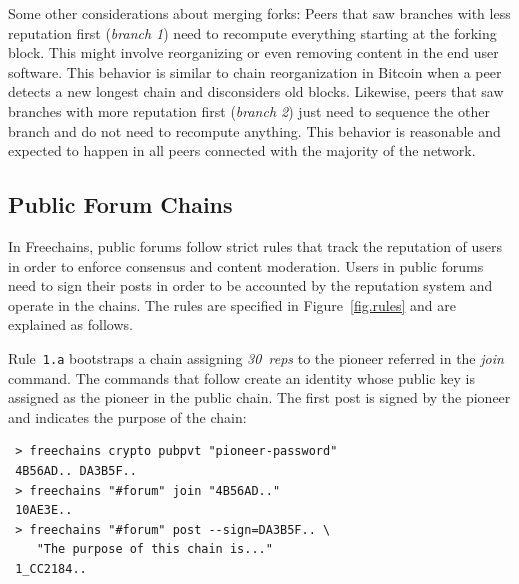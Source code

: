 \documentclass[10pt,journal,compsoc]{IEEEtran}
\newcommand{\FC}       {Freechains\xspace}
\newcommand{\reps}     {\emph{reps}\xspace}
\newcommand{\nreps}[1] {\emph{#1~reps\xspace}}
\begin{document}
Some other considerations about merging forks:
Peers that saw branches with less reputation first (\emph{branch 1}) need to
recompute everything starting at the forking block.
This might involve reorganizing or even removing content in the end user
software.
This behavior is similar to chain reorganization in Bitcoin when a peer detects
a new longest chain and disconsiders old blocks.
%
Likewise, peers that saw branches with more reputation first (\emph{branch 2})
just need to sequence the other branch and do not need to recompute anything.
This behavior is reasonable and expected to happen in all peers connected with
the majority of the network.

\subsection{Public Forum Chains}

In \FC, public forums follow strict rules that track the reputation of users in
order to enforce consensus and content moderation.
Users in public forums need to sign their posts in order to be accounted by the
reputation system and operate in the chains.
The rules are specified in Figure~\ref{fig.rules} and are explained as follows.

Rule~\texttt{1.a} bootstraps a chain assigning \nreps{30} to the pioneer
referred in the \emph{join} command.
The commands that follow create an identity whose public key is assigned as the
pioneer in the public chain.
The first post is signed by the pioneer and indicates the purpose of the chain:

{\footnotesize
\begin{verbatim}
 > freechains crypto pubpvt "pioneer-password"
 4B56AD.. DA3B5F..
 > freechains "#forum" join "4B56AD.."
 10AE3E..
 > freechains "#forum" post --sign=DA3B5F.. \
    "The purpose of this chain is..."
 1_CC2184..
\end{verbatim}
}
\end{document}

